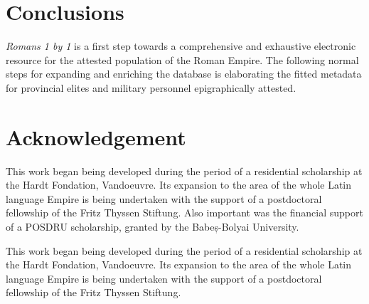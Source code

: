 \documentclass[amsthm,ebook]{saparticle}
\begin{document}
\section{Conclusions}

\noindent \emph{Romans 1 by 1} is a first step towards a comprehensive and exhaustive electronic resource for the attested population of
the Roman Empire. The following normal steps for expanding and enriching the database is elaborating the fitted
metadata for provincial elites and military personnel epigraphically attested.



\section*{Acknowledgement}
This work began being developed during the period of a residential scholarship at the Hardt Fondation, Vandoeuvre. Its
expansion to the area of the whole Latin language Empire is being undertaken with the support of a postdoctoral
fellowship of the Fritz Thyssen Stiftung. Also important was the financial support of a POSDRU scholarship, granted by
the Babeș-Bolyai University.

This work began being developed during the period of a residential scholarship at the Hardt Fondation, Vandoeuvre. Its
expansion to the area of the whole Latin language Empire is being undertaken with the support of a postdoctoral
fellowship of the Fritz Thyssen Stiftung. 



\end{document}
